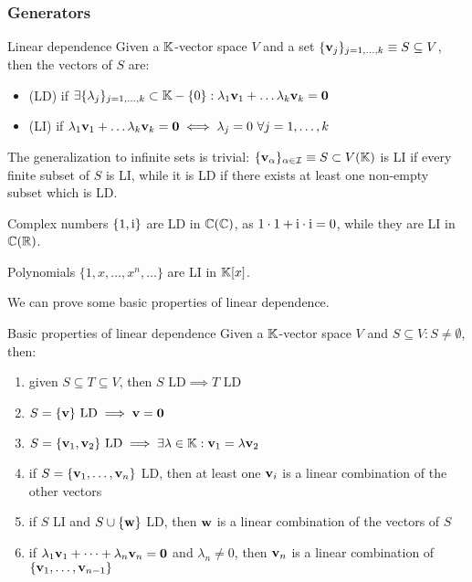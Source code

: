 \subsubsection{Generators}

\begin{definition}{Linear dependence}{}
  Given a $ \mathbb{K} $-vector space $ V $ and a set $ \{\mathbf{v}_j\}_{j = 1, \dots, k} \equiv S \subseteq V $, then the vectors of $ S $ are:
  \begin{itemize}
    \item {} (LD) if $ \exists \{\lambda_j\}_{j = 1, \dots, k} \subset \mathbb{K} - \{0\} : \lambda_1 \mathbf{v}_1 + \dots \lambda_k \mathbf{v}_k = \mathbf{0} $
    \item {} (LI) if $ \lambda_1 \mathbf{v}_1 + \dots \lambda_k \mathbf{v}_k = \mathbf{0} \iff \lambda_j = 0 \,\,\forall j = 1, \dots, k $
  \end{itemize}
\end{definition}

The generalization to infinite sets is trivial: $ \{\mathbf{v}_\alpha\}_{\alpha \in \mathcal{I}} \equiv S \subset V(\mathbb{K}) $ is LI if every finite subset of $ S $ is LI, while it is LD if there exists at least one non-empty subset which is LD.

\begin{example}{Complex numbers}{}
  $ \{1, \mathrm{i}\} $ are LD in $ \mathbb{C}(\mathbb{C}) $, as $ 1 \cdot 1 + \mathrm{i} \cdot \mathrm{i} = 0 $, while they are LI in $ \mathbb{C}(\mathbb{R}) $.
\end{example}

\begin{example}{Polynomials}{}
  $ \{1, x, \dots, x^n, \dots\} $ are LI in $ \mathbb{K}[x] $.
\end{example}

We can prove some basic properties of linear dependence.

\begin{lemma}{Basic properties of linear dependence}{}
  Given a $ \mathbb{K} $-vector space $ V $ and $ S \subseteq V : S \neq \emptyset $, then:
  \begin{enumerate}[label = {\alph*.}]
    \item given $ S \subseteq T \subseteq V $, then $ S \text{ LD} \implies T \text{ LD} $
    \item $ S = \{\mathbf{v}\} \text{ LD} \implies \mathbf{v} = \mathbf{0} $
    \item $ S = \{\mathbf{v}_1 , \mathbf{v}_2\} \text{ LD} \implies \exists \lambda \in \mathbb{K} : \mathbf{v}_1 = \lambda \mathbf{v}_2 $
    \item if $ S = \{\mathbf{v}_1 , \dots , \mathbf{v}_n\} $ LD, then at least one $ \mathbf{v}_i $ is a linear combination of the other vectors
    \item if $ S $ LI and $ S \cup \{\mathbf{w}\} $ LD, then $ \mathbf{w} $ is a linear combination of the vectors of $ S $
    \item if $ \lambda_1 \mathbf{v}_1 + \dots + \lambda_n \mathbf{v}_n = \mathbf{0} $ and $ \lambda_n \neq 0 $, then $ \mathbf{v}_n $ is a linear combination of $ \{\mathbf{v}_1 , \dots , \mathbf{v}_{n-1}\} $
  \end{enumerate}
\end{lemma}

